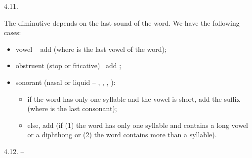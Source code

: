 \begin{refsection}
\begin{practiceproblemsolution}{4.11. \langnameDutch}

 The diminutive depends on the last sound of the word. We have the following cases:

\begin{itemize}
    \item vowel \Rightarrow~ add  (where  is the last vowel of the word);
    \item obstruent (stop or fricative) \Rightarrow~add ;
    \item sonorant (nasal or liquid -- , , , ):
    \begin{itemize}
        \item if the word has only one syllable and the vowel is short, add the suffix  (where  is the last consonant);
        \item else, add  (if (1) the word has only one syllable and contains a long vowel or a diphthong or (2) the word contains more than a syllable).
    \end{itemize}
\end{itemize}

\end{practiceproblemsolution}
\pagebreak
\begin{practiceproblemsolution}{4.12. \langnameFinnish{} -- \langnameEstonian}


\end{practiceproblemsolution}
\end{refsection}
